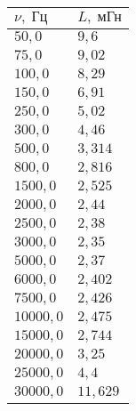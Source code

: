 \begin{tabular}{|l|l|}
\hline
$\nu,\;\text{Гц}$ & $L,\;\text{мГн}$\\\hline
$50{,}0$ & $9{,}6$\\\hline
$75{,}0$ & $9{,}02$\\\hline
$100{,}0$ & $8{,}29$\\\hline
$150{,}0$ & $6{,}91$\\\hline
$250{,}0$ & $5{,}02$\\\hline
$300{,}0$ & $4{,}46$\\\hline
$500{,}0$ & $3{,}314$\\\hline
$800{,}0$ & $2{,}816$\\\hline
$1500{,}0$ & $2{,}525$\\\hline
$2000{,}0$ & $2{,}44$\\\hline
$2500{,}0$ & $2{,}38$\\\hline
$3000{,}0$ & $2{,}35$\\\hline
$5000{,}0$ & $2{,}37$\\\hline
$6000{,}0$ & $2{,}402$\\\hline
$7500{,}0$ & $2{,}426$\\\hline
$10000{,}0$ & $2{,}475$\\\hline
$15000{,}0$ & $2{,}744$\\\hline
$20000{,}0$ & $3{,}25$\\\hline
$25000{,}0$ & $4{,}4$\\\hline
$30000{,}0$ & $11{,}629$\\\hline
\end{tabular}
